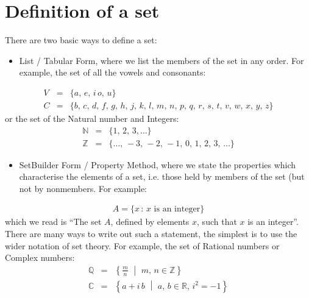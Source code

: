 \documentclass[letterpaper,10pt,english]{jupyterBook}
\begin{document}
\section{Definition of a set}
\label{\detokenize{ProofLogic/setsnotation:definition-of-a-set}}
\sphinxAtStartPar
There are two basic ways to define a set:
\begin{itemize}
\item {} 
\sphinxAtStartPar
List / Tabular Form, where we list the members of the set in any order.  For example, the set of all the vowels and consonants:

\end{itemize}
\begin{equation*}
\begin{split}    V &=& \{a,\,e,\,i\,o,\,u\} \\
    C &=& \{b,\,c,\,d,\,f,\,g,\,h,\,j,\,k,\,l,\,m,\,n,\,p,\,q,\,r,\,s,\,t,\,v,\,w,\,x,\,y,\,z\}\end{split}
\end{equation*}
\sphinxAtStartPar
or the set of the Natural number and Integers:
\begin{equation*}
\begin{split}    \mathbb{N} &=& \{1,\,2,\,3,\dots \} \\
    \mathbb{Z} &=& \{ \dots,\,-3,\,-2,\,-1,\,0,\,1,\,2,\,3,\,\dots \}\end{split}
\end{equation*}\begin{itemize}
\item {} 
\sphinxAtStartPar
Set\sphinxhyphen{}Builder Form / Property Method,
where we state the properties which characterise the elements of a set, i.e. those held by members of the set (but not by non\sphinxhyphen{}members.  For example:

\end{itemize}
\begin{equation*}
\begin{split}    A = \{x\,:\, x \text{ is an integer}\}\end{split}
\end{equation*}
\sphinxAtStartPar
which we read is “The set \(A\), defined by elements \(x\), such that \(x\) is an integer”.  There are many ways to write out such a statement, the simplest is
to use the wider notation of set theory.   For example, the set of Rational numbers or Complex numbers:
\begin{equation*}
\begin{split}    \mathbb{Q} &=& \left\{ \frac{m}{n} \,\,\middle|\,\, m,\,n \in  \mathbb{Z}\right\} \\
    \mathbb{C} &=& \left\{ a + i\,b \,\,\middle|\,\, a,\,b\in \mathbb{R},\, i^2 = -1\right\}\end{split}
\end{equation*}
\end{document}
